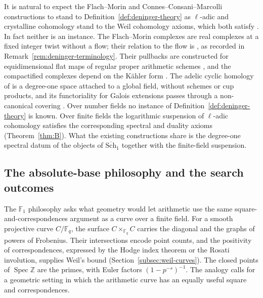 \documentclass[11pt]{amsart}
\theoremstyle{plain}
\theoremstyle{definition}
\theoremstyle{remark}
\numberwithin{equation}{section}
\newcommand{\Z}{\mathbb{Z}}
\newcommand{\F}{\mathbb{F}}
\newcommand{\Schbar}{\overline{\mathrm{Sch}}}
\DeclareMathOperator{\Spec}{Spec}
\begin{document}
It is natural to expect the Flach--Morin and Connes--Consani--Marcolli
constructions to stand to Definition~\ref{def:deninger-theory} as
$\ell$-adic and crystalline cohomology stand to the Weil cohomology
axioms, which both satisfy
\cite[\S1.2, pp.~362--363, and Examples~1.2.5, p.~364]%
{Kleiman1968Cycles}. In fact neither is an instance. The Flach--Morin
complexes are real complexes at a fixed integer twist without a flow;
their relation to the flow is
\cite[Conjecture~4.1, p.~527, and Remark~4.15, p.~535]%
{FlachMorin2020DeningerWeilArakelov}, as recorded in
Remark~\ref{rem:deninger-terminology}. Their pullbacks are constructed
for equidimensional flat maps of regular proper arithmetic schemes
\cite[\S6.6, p.~1522]{FlachMorin2018WeilEtale}, and the
compactified complexes depend on the K\"ahler form
\cite[\S3.2, p.~523]{FlachMorin2020DeningerWeilArakelov}. The adelic
cyclic homology of
\cite[Definition~4.10, p.~21]{ConnesConsaniMarcolli2009Weil} is a
degree-one space attached to a global field, without schemes or cup
products, and its functoriality for Galois extensions passes through a
non-canonical covering \cite[\S9, pp.~50--54]%
{ConnesConsaniMarcolli2009Weil}. Over number fields no instance of
Definition~\ref{def:deninger-theory} is known. Over finite fields
the logarithmic suspension of $\ell$-adic cohomology satisfies the
corresponding spectral and duality axioms (Theorem~\ref{thm:B}).
What the existing constructions share is the
degree-one spectral datum of the objects of $\Schbar_1$ together with
the finite-field suspension.

\subsection{The absolute-base philosophy and the search outcomes}
\label{subsec:f1-search}

The $\F_1$ philosophy asks what geometry would let arithmetic use the
same square-and-correspondences argument as a curve over a finite
field. For a smooth projective curve $C/\F_q$, the surface
$C\times_{\F_q}C$ carries the diagonal and the graphs of powers of
Frobenius. Their intersections encode point counts, and the positivity
of correspondences, expressed by the Hodge index theorem or the Rosati
involution, supplies Weil's bound
(Section~\ref{subsec:weil-curves}). The closed points of $\Spec\Z$
are the primes, with Euler factors $(1-p^{-s})^{-1}$. The analogy calls
for a geometric setting in which the arithmetic curve has an equally
useful square and correspondences.
\end{document}
